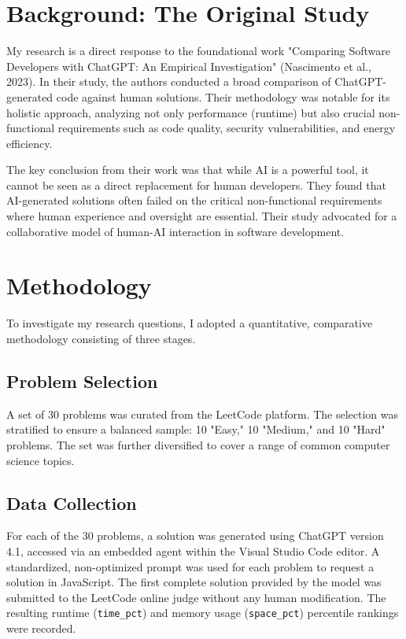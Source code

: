 \documentclass[12pt, a4paper]{article}
\begin{document}
\section{Background: The Original Study}

My research is a direct response to the foundational work "Comparing Software Developers with ChatGPT: An Empirical Investigation" (Nascimento et al., 2023). In their study, the authors conducted a broad comparison of ChatGPT-generated code against human solutions. Their methodology was notable for its holistic approach, analyzing not only performance (runtime) but also crucial non-functional requirements such as code quality, security vulnerabilities, and energy efficiency.

The key conclusion from their work was that while AI is a powerful tool, it cannot be seen as a direct replacement for human developers. They found that AI-generated solutions often failed on the critical non-functional requirements where human experience and oversight are essential. Their study advocated for a collaborative model of human-AI interaction in software development.

\section{Methodology}

To investigate my research questions, I adopted a quantitative, comparative methodology consisting of three stages.

\subsection{Problem Selection}
A set of 30 problems was curated from the LeetCode platform. The selection was stratified to ensure a balanced sample: 10 "Easy," 10 "Medium," and 10 "Hard" problems. The set was further diversified to cover a range of common computer science topics.

\subsection{Data Collection}
For each of the 30 problems, a solution was generated using ChatGPT version 4.1, accessed via an embedded agent within the Visual Studio Code editor. A standardized, non-optimized prompt was used for each problem to request a solution in JavaScript. The first complete solution provided by the model was submitted to the LeetCode online judge without any human modification. The resulting runtime (\texttt{time\_pct}) and memory usage (\texttt{space\_pct}) percentile rankings were recorded.
\end{document}
